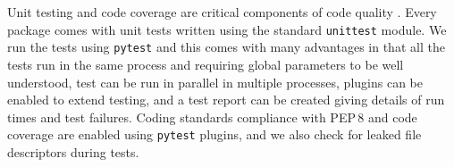 Unit testing and code coverage are critical components of code quality \citep{2018SPIE10707E..09J}.
Every package comes with unit tests written using the standard \texttt{unittest} module.
We run the tests using \texttt{pytest} \citep{pytest} and this comes with many advantages in that all the tests run in the same process and requiring global parameters to be well understood, test can be run in parallel in multiple processes, plugins can be enabled to extend testing, and a test report can be created giving details of run times and test failures.
Coding standards compliance with PEP\,8 \citep{pep8} and code coverage are enabled using \texttt{pytest} plugins, and we also check for leaked file descriptors during tests.
